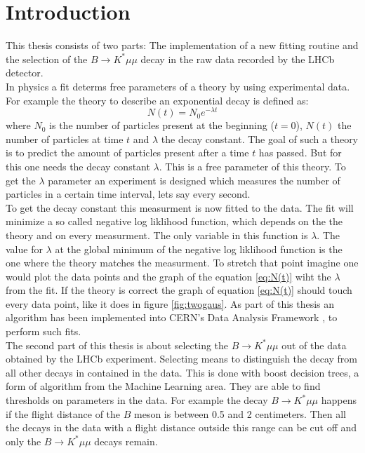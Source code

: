 \documentclass[english]{uzhpub}
\begin{document}
\section*{Introduction}

This thesis consists of two parts: The implementation of a new fitting routine and the selection of the $B \rightarrow K^* \mu \mu$ decay in the raw data recorded by the LHCb detector. \\
In physics a fit determs free parameters of a theory by using experimental data. For example the theory to describe an exponential decay is defined as:
\begin{equation}
  N(t) = N_0 e^{- \lambda t} \label{eq:N(t)}
\end{equation}
where $N_0$ is the number of particles present at the beginning ($t = 0$), $N(t)$ the number of particles at time $t$ and $\lambda$ the decay constant. The goal of such a theory is to predict the amount of particles present after a time $t$ has passed. But for this one needs the decay constant $\lambda$. This is a free parameter of this theory. To get the $\lambda$ parameter an experiment is designed which measures the number of particles in a certain time interval, lets say every second. \\
To get the decay constant this measurment is now fitted to the data. The fit will minimize a so called negative log liklihood function, which depends on the the theory and on every measurment. The only variable in this function is $\lambda$. The value for $\lambda$ at the global minimum of the negative log liklihood function is the one where the theory matches the measurment. To stretch that point imagine one would plot the data points and the graph of the equation \ref{eq:N(t)} wiht the $\lambda$ from the fit. If the theory is correct the graph of equation \ref{eq:N(t)} should touch every data point, like it does in figure \ref{fig:twogaus}. As part of this thesis an algorithm has been implemented into CERN's Data Analysis Framework \cite{bib:root}, to perform such fits. \\
The second part of this thesis is about selecting the $B \rightarrow K^* \mu \mu$ out of the data obtained by the LHCb experiment. Selecting means to distinguish the decay from all other decays in contained in the data. This is done with boost decision trees, a form of algorithm from the Machine Learning area. They are able to find thresholds on parameters in the data. For example the decay $B \rightarrow K^* \mu \mu$ happens if the flight distance of the $B$ meson is between 0.5 and 2 centimeters. Then all the decays in the data with a flight distance outside this range can be cut off and only the $B \rightarrow K^* \mu \mu$ decays remain.
\end{document}
